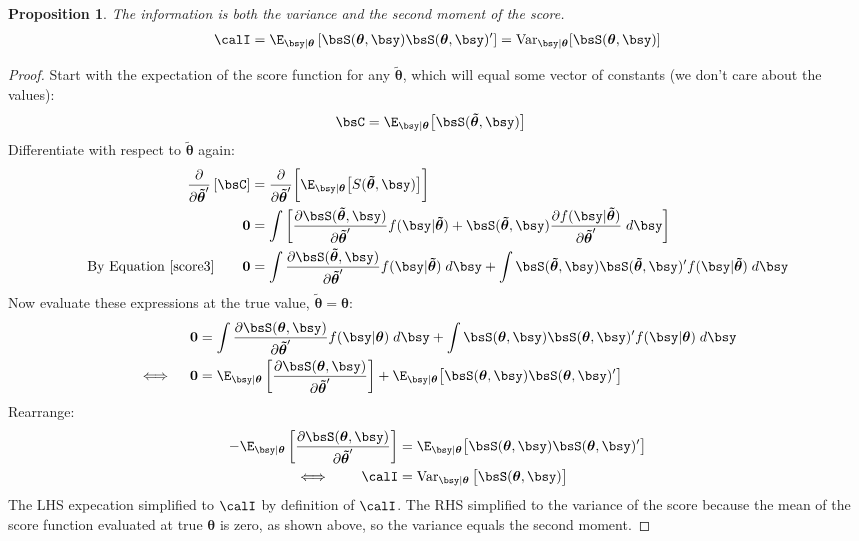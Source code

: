 \documentclass[12pt]{article}
\theoremstyle{plain}
\newtheorem{prop}[thm]{Proposition}
\theoremstyle{definition}
\theoremstyle{remark}
\newcommand{\bstheta}{\boldsymbol{\theta}}
\newcommand{\bstildetheta}{\boldsymbol{\tilde{\theta}}}
\renewcommand{\bso}{\boldsymbol{0}}
\newcommand{\Var}{\operatorname{Var}}
\begin{document}
\begin{prop}
The information is both the variance and the second moment of the score.
\begin{align*}
  \calI
  = \E_{\bsy|\bstheta}\left[\bsS(\bstheta,\bsy)\bsS(\bstheta,\bsy)'\right]
  = \Var_{\bsy|\bstheta}[\bsS(\bstheta,\bsy)]
\end{align*}
\end{prop}
\begin{proof}
Start with the expectation of the score function for any
$\bstildetheta$, which will equal some vector of constants (we don't
care about the values):
\begin{align*}
  \bsC
  &= \E_{\bsy|\bstheta}\big[\bsS(\bstildetheta,\bsy)\big]
\end{align*}
Differentiate with respect to $\bstildetheta$ again:
\begin{align*}
  \frac{\partial}{\partial\bstildetheta'}
  \left[ \bsC \right]
  &=
  \frac{\partial}{\partial\bstildetheta'}
  \bigg[
  \E_{\bsy|\bstheta}\big[S(\bstildetheta,\bsy)\big]
  \bigg] \\
  \bso &=
  \int
  \left[
  \frac{\partial \bsS(\bstildetheta,\bsy)}{\partial\bstildetheta'}
  f(\bsy|\bstildetheta)
  +
  \bsS(\bstildetheta,\bsy)
  \frac{\partial f(\bsy|\bstildetheta)}{\partial\bstildetheta'}
  \;
  d\bsy
  \right]
  \\
  \text{By Equation~\ref{score3}}
  \qquad
  \bso &=
  \int
  \frac{\partial \bsS(\bstildetheta,\bsy)}{\partial\bstildetheta'}
  f(\bsy|\bstildetheta)
  \; d\bsy
  +
  \int
  \bsS(\bstildetheta,\bsy)\bsS(\bstildetheta,\bsy)' f(\bsy|\bstildetheta) \;
  d\bsy
\end{align*}
Now evaluate these expressions at the true value,
$\bstildetheta=\bstheta$:
\begin{align*}
  \bso &=
  \int
  \frac{\partial \bsS(\bstheta,\bsy)}{\partial\bstildetheta'}
  f(\bsy|\bstheta)
  \; d\bsy
  +
  \int
  \bsS(\bstheta,\bsy)\bsS(\bstheta,\bsy)' f(\bsy|\bstheta) \;
  d\bsy
  \\
  \iff\quad
  \bso
  &=
  \E_{\bsy|\bstheta}\left[
  \frac{\partial \bsS(\bstheta,\bsy)}{\partial\bstildetheta'}
  \right]
  +
  \E_{\bsy|\bstheta}\big[
  \bsS(\bstheta,\bsy)\bsS(\bstheta,\bsy)'
  \big]
\end{align*}
Rearrange:
\begin{align*}
  -\E_{\bsy|\bstheta}\left[
  \frac{\partial \bsS(\bstheta,\bsy)}{\partial\bstildetheta'}
  \right]
  &=
  \E_{\bsy|\bstheta}\big[
  \bsS(\bstheta,\bsy)\bsS(\bstheta,\bsy)'
  \big] \\
  \iff \qquad
  \calI
  &=
  \Var_{\bsy|\bstheta}\big[
  \bsS(\bstheta,\bsy)
  \big]
\end{align*}
The LHS expecation simplified to $\calI$ by definition of $\calI$. The
RHS simplified to the variance of the score because the mean of the
score function evaluated at true $\bstheta$ is zero, as shown above, so
the variance equals the second moment.
\end{proof}
\end{document}
